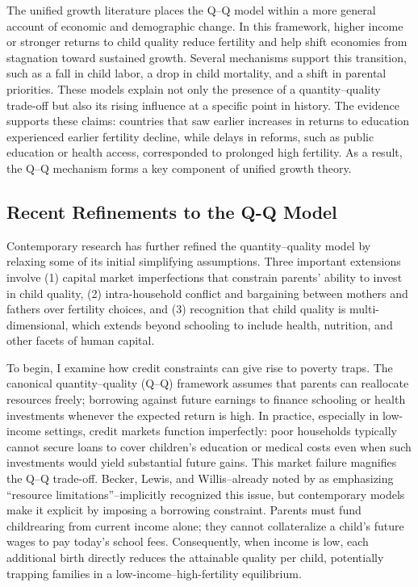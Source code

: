\documentclass[]{AEA}
\begin{document}
The unified growth literature places the Q--Q model within a more
general account of economic and demographic change. In this framework,
higher income or stronger returns to child quality reduce fertility and
help shift economies from stagnation toward sustained growth. Several
mechanisms support this transition, such as a fall in child labor, a
drop in child mortality, and a shift in parental priorities. These
models explain not only the presence of a quantity--quality trade-off
but also its rising influence at a specific point in history. The
evidence supports these claims: countries that saw earlier increases in
returns to education experienced earlier fertility decline, while delays
in reforms, such as public education or health access, corresponded to
prolonged high fertility. As a result, the Q--Q mechanism forms a key
component of unified growth theory.

\subsection{Recent Refinements to the Q-Q Model}

Contemporary research has further refined the quantity--quality model by
relaxing some of its initial simplifying assumptions. Three important
extensions involve (1) capital market imperfections that constrain
parents' ability to invest in child quality, (2) intra-household
conflict and bargaining between mothers and fathers over fertility
choices, and (3) recognition that child quality is multi-dimensional,
which extends beyond schooling to include health, nutrition, and other
facets of human capital.

To begin, I examine how credit constraints can give rise to poverty
traps. The canonical quantity--quality (Q--Q) framework assumes that
parents can reallocate resources freely; borrowing against future
earnings to finance schooling or health investments whenever the
expected return is high. In practice, especially in low-income settings,
credit markets function imperfectly: poor households typically cannot
secure loans to cover children's education or medical costs even when
such investments would yield substantial future gains. This market
failure magnifies the Q--Q trade-off. Becker, Lewis, and Willis--already
noted by \citet{grawe2008quality} as emphasizing ``resource
limitations''--implicitly recognized this issue, but contemporary models
make it explicit by imposing a borrowing constraint. Parents must fund
childrearing from current income alone; they cannot collateralize a
child's future wages to pay today's school fees. Consequently, when
income is low, each additional birth directly reduces the attainable
quality per child, potentially trapping families in a
low-income--high-fertility equilibrium.
\end{document}

